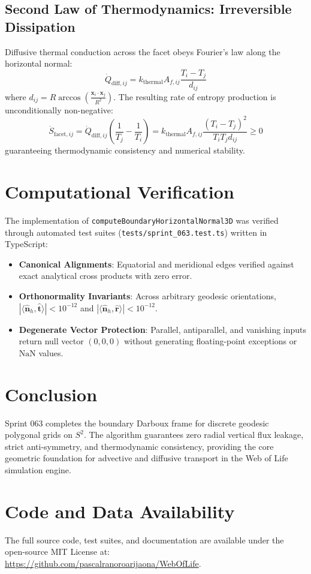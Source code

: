 \documentclass[11pt,a4paper]{article}
\begin{document}
\subsection{Second Law of Thermodynamics: Irreversible Dissipation}
Diffusive thermal conduction across the facet obeys Fourier's law along the horizontal normal:
\begin{equation}
\dot{Q}_{\text{diff}, ij} = k_{\text{thermal}} A_{f, ij} \frac{T_i - T_j}{d_{ij}}
\end{equation}
where $d_{ij} = R \arccos\left(\frac{\mathbf{x}_i \cdot \mathbf{x}_j}{R^2}\right)$. The resulting rate of entropy production is unconditionally non-negative:
\begin{equation}
\dot{S}_{\text{facet}, ij} = \dot{Q}_{\text{diff}, ij} \left( \frac{1}{T_j} - \frac{1}{T_i} \right) = k_{\text{thermal}} A_{f, ij} \frac{(T_i - T_j)^2}{T_i T_j d_{ij}} \ge 0
\end{equation}
guaranteeing thermodynamic consistency and numerical stability.

\section{Computational Verification}
The implementation of \texttt{computeBoundaryHorizontalNormal3D} was verified through automated test suites (\texttt{tests/sprint\_063.test.ts}) written in TypeScript:
\begin{itemize}
  \item \textbf{Canonical Alignments}: Equatorial and meridional edges verified against exact analytical cross products with zero error.
  \item \textbf{Orthonormality Invariants}: Across arbitrary geodesic orientations, $|\langle \hat{\mathbf{n}}_h, \hat{\mathbf{t}} \rangle| < 10^{-12}$ and $|\langle \hat{\mathbf{n}}_h, \hat{\mathbf{r}} \rangle| < 10^{-12}$.
  \item \textbf{Degenerate Vector Protection}: Parallel, antiparallel, and vanishing inputs return null vector $(0, 0, 0)$ without generating floating-point exceptions or $\mathrm{NaN}$ values.
\end{itemize}

\section{Conclusion}
Sprint 063 completes the boundary Darboux frame for discrete geodesic polygonal grids on $S^2$. The algorithm guarantees zero radial vertical flux leakage, strict anti-symmetry, and thermodynamic consistency, providing the core geometric foundation for advective and diffusive transport in the Web of Life simulation engine.

\section*{Code and Data Availability}
The full source code, test suites, and documentation are available under the open-source MIT License at: \\
\url{https://github.com/pascalranoroarijaona/WebOfLife}.
\end{document}
